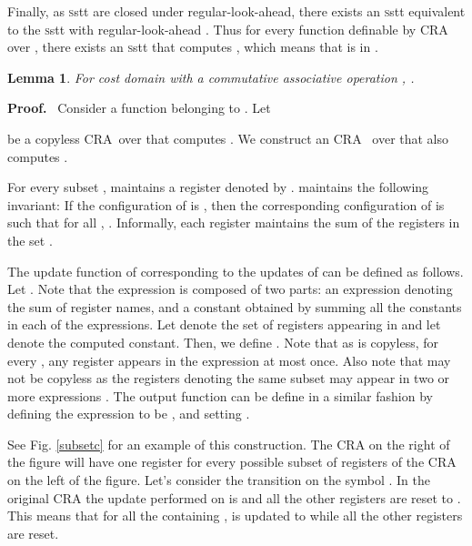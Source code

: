 \documentclass[11pt]{article}
\newtheorem{lemma}[theorem]{Lemma}
\def\Proof{{\bf Proof.}}
\def\qed{{\bf }}
\def\qed{{\bf }}
\newcommand{\SSTT}{{\sc\textsc sstt}\xspace}
\newcommand{\EDWA}{{CRA}\xspace}
\begin{document}
Finally, as \SSTT are closed under regular-look-ahead, there exists an
\SSTT  equivalent to the \SSTT with regular-look-ahead .
Thus for every function definable by \EDWA over , there exists an \SSTT  that computes , which means that
 is in .
\qed


\begin{lemma}
\label{ppcedwatopedwa}
For cost domain  with a commutative associative operation
, .
\end{lemma}

\Proof~ Consider a function  belonging to
.  Let

be a copyless \EDWA~over  that computes .  We
construct an
\EDWA~
over  that also computes .

For every subset ,  maintains a
register denoted by .   maintains the following invariant: If
the configuration of  is , then the
corresponding configuration of  is  such
that for all , .  Informally, each register  maintains the sum of the
registers in the set .

The update function  of  corresponding to the updates of
 can be defined as follows.  Let .
Note that the expression  is composed of two parts: an expression
denoting the sum of register names, and a constant obtained by summing all
the constants in each of the  expressions. Let 
denote the set of registers appearing in  and let  denote the
computed constant.  Then, we define . Note that as  is copyless, for every , any register  appears in the expression  at most once. Also note that
 may not be copyless as the registers  denoting the same
subset  may appear in two or more expressions . The
output function can be define in a similar fashion by defining the
expression  to be , and setting .
\qed

See Fig. \ref{subsetc} for an example of this construction.  The CRA on
the right of the figure will have one register for every possible subset
of registers of the CRA on the left of the figure. Let's consider the
transition on the symbol .  In the original CRA the update performed on
 is  and all the other registers are reset to .  This
means that for all the  containing ,  is updated to
 while all the other registers are reset.
\end{document}

